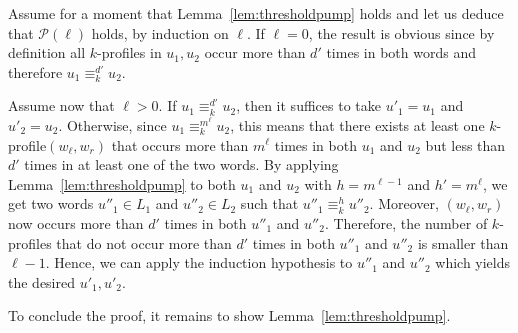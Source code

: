 \documentclass{LMCS}
\newcommand\Ps{\ensuremath{\mathcal{P}}\xspace}
\newcommand\profile[1]{$#1$-profile\xspace}
\newcommand\profiles[1]{$#1$-profiles\xspace}
\newcommand\kprofile{\profile{k}}
\newcommand\kprofiles{\profiles{k}}
\newcommand\ltteq[2]{\ensuremath{\equiv_{#1}^{#2}}\xspace}
\theoremstyle{plain}
\begin{document}
Assume for a moment that Lemma~\ref{lem:thresholdpump} holds and let
us deduce that $\Ps(\ell)$ holds, by induction on $\ell$.
If $\ell=0$, the result is obvious since by definition all \kprofiles
in $u_1,u_2$ occur more than $d'$ times in both words and therefore
$u_1 \ltteq{k}{d'} u_2$.

Assume now that $\ell > 0$. If $u_1 \ltteq{k}{d'} u_2$, then it suffices
to take $u'_1=u_1$ and $u'_2=u_2$. Otherwise, since $u_1
\ltteq{k}{m^{\ell}} u_2$, this means that there exists at least
one \kprofile $(w_\ell,w_r)$ that occurs more than $m^{\ell}$
times in both $u_1$ and $u_2$ but less than $d'$ times in at least one
of the two words. By applying Lemma~\ref{lem:thresholdpump} to both
$u_1$ and $u_2$ with $h=m^{\ell-1}$ and $h'=m^{\ell}$, we get
two words $u''_1\in L_1$ and $u''_2 \in L_2$ such that $u''_1
\ltteq{k}{h} u''_2$. Moreover, $(w_\ell,w_r)$ now occurs more than
$d'$ times in both $u''_1$ and $u''_2$. Therefore, the number of
\kprofiles that do not occur more than $d'$ times in both $u''_1$ and
$u''_2$ is smaller than $\ell-1$. Hence, we can apply the induction
hypothesis to $u''_1$ and $u''_2$ which yields the desired
$u'_1,u'_2$.

\medskip\noindent
To conclude the proof, it remains to show
Lemma~\ref{lem:thresholdpump}.
\end{document}
